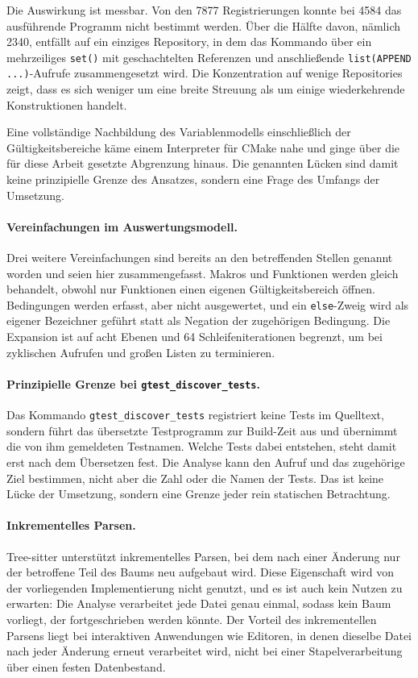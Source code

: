 \documentclass[12pt,a4paper,twoside,headsepline,parskip=half]{scrreprt}
\begin{document}
Die Auswirkung ist messbar. Von den 7877 Registrierungen konnte bei 4584 das
ausführende Programm nicht bestimmt werden. Über die Hälfte davon, nämlich 2340,
entfällt auf ein einziges Repository, in dem das Kommando über ein mehrzeiliges
\texttt{set()} mit geschachtelten Referenzen und anschließende
\texttt{list(APPEND ...)}-Aufrufe zusammengesetzt wird. Die Konzentration auf wenige
Repositories zeigt, dass es sich weniger um eine breite Streuung als um einige
wiederkehrende Konstruktionen handelt.

Eine vollständige Nachbildung des Variablenmodells einschließlich der
Gültigkeitsbereiche käme einem Interpreter für CMake nahe und ginge über die für diese
Arbeit gesetzte Abgrenzung hinaus. Die genannten Lücken sind damit keine prinzipielle
Grenze des Ansatzes, sondern eine Frage des Umfangs der Umsetzung.

\paragraph{Vereinfachungen im Auswertungsmodell.}
Drei weitere Vereinfachungen sind bereits an den betreffenden Stellen genannt worden
und seien hier zusammengefasst. Makros und Funktionen werden gleich behandelt, obwohl
nur Funktionen einen eigenen Gültigkeitsbereich öffnen. Bedingungen werden erfasst,
aber nicht ausgewertet, und ein \texttt{else}-Zweig wird als eigener Bezeichner
geführt statt als Negation der zugehörigen Bedingung. Die Expansion ist auf acht
Ebenen und 64 Schleifeniterationen begrenzt, um bei zyklischen Aufrufen und großen
Listen zu terminieren.

\paragraph{Prinzipielle Grenze bei \texttt{gtest\_discover\_tests}.}
Das Kommando \texttt{gtest\discretionary{}{}{}\_discover\discretionary{}{}{}\_tests} registriert keine Tests im
Quelltext,
sondern führt das übersetzte Testprogramm zur Build-Zeit aus und übernimmt die von ihm
gemeldeten Testnamen. Welche Tests dabei entstehen, steht damit erst nach dem
Übersetzen fest. Die Analyse kann den Aufruf und das zugehörige Ziel bestimmen, nicht
aber die Zahl oder die Namen der Tests. Das ist keine Lücke der Umsetzung, sondern
eine Grenze jeder rein statischen Betrachtung.

\paragraph{Inkrementelles Parsen.}
Tree-sitter unterstützt inkrementelles Parsen, bei dem nach einer Änderung nur der
betroffene Teil des Baums neu aufgebaut wird. Diese Eigenschaft wird von der
vorliegenden Implementierung nicht genutzt, und es ist auch kein Nutzen zu erwarten:
Die Analyse verarbeitet jede Datei genau einmal, sodass kein Baum vorliegt, der
fortgeschrieben werden könnte. Der Vorteil des inkrementellen Parsens liegt bei
interaktiven Anwendungen wie Editoren, in denen dieselbe Datei nach jeder Änderung
erneut verarbeitet wird, nicht bei einer Stapelverarbeitung über einen festen
Datenbestand.
\end{document}

